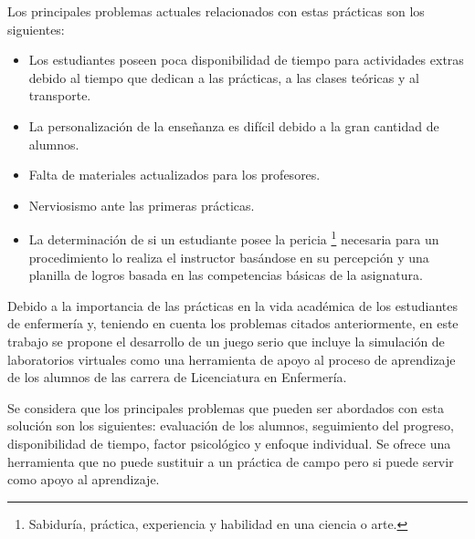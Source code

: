 Los principales problemas actuales relacionados con estas prácticas son los 
siguientes:

\begin{itemize}
\item Los estudiantes poseen poca disponibilidad de tiempo para actividades
    extras debido al tiempo que dedican a las prácticas, a las clases teóricas y
    al transporte\cite{iab:tesis_alumnos}.
\item La personalización de la enseñanza es difícil debido a la gran cantidad de
    alumnos\cite{iab:tesis_alumnos}.
\item Falta de materiales actualizados para los
    profesores\cite{iab:tesis_alumnos}.
\item Nerviosismo ante las primeras prácticas.
\item La determinación de si un estudiante posee la pericia \footnote{Sabiduría,
        práctica, experiencia y habilidad en una ciencia o arte.} necesaria para
    un procedimiento lo realiza el instructor basándose en su percepción y una
    planilla de logros basada en las competencias básicas de la asignatura.
\end{itemize}

Debido a la importancia de las prácticas en la vida académica de los estudiantes
de enfermería y, teniendo en cuenta los problemas citados anteriormente, en este
trabajo se propone el desarrollo de un juego serio que incluye la simulación de
laboratorios virtuales como una herramienta de apoyo al proceso de aprendizaje
de los alumnos de las carrera de Licenciatura en Enfermería. 

Se considera que los principales problemas que pueden ser abordados con esta
solución son los siguientes: evaluación de los alumnos, seguimiento del progreso, disponibilidad de
tiempo, factor psicológico y enfoque individual. Se ofrece una herramienta que no puede
sustituir a un práctica de campo pero si puede servir como apoyo al aprendizaje.

